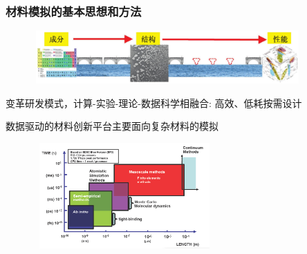 \frame
{
	\frametitle{材料模拟的基本思想和方法}
\begin{figure}[h!]
\vspace*{-0.25in}
\centering
\includegraphics[height=0.80in,width=4.05in]{Figures/MGE-2.png}
\label{MGE}
\end{figure}
\begin{minipage}[c]{0.30\textwidth}
\begin{itemize}%
\vspace*{-2.25in}
 {\fontsize{7.5pt}{6.0pt}\selectfont
	 \setlength{\itemsep}{10pt}
 \item 变革研发模式，计算-实验-理论-数据科学相融合: 高效、低耗按需设计
 \item 数据驱动的材料创新平台主要面向复杂材料的模拟}
 \end{itemize}
\end{minipage}
\hfill
\begin{minipage}[b]{0.68\textwidth}
\begin{figure}[h!]
\centering
\includegraphics[height=1.60in,width=2.75in]{Figures/Multi-Scale-6.png}
\label{Multi-Scale}
\end{figure}
\end{minipage}
}


